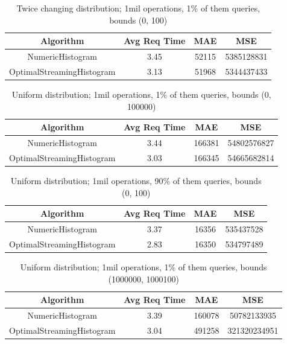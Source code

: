 \documentclass[12pt]{article}
\begin{document}
	\begin{table}[h!]
		\begin{center}
			\caption{Twice changing distribution; 1mil operations, 1\% of them queries, bounds (0, 100)}
			\label{tab:uniform}
			\begin{tabular}{c|c|c|c}
				\textbf{Algorithm} & \textbf{Avg Req Time} & \textbf{MAE} & \textbf{MSE}\\
				\hline
				NumericHistogram & 3.45 & 52115 & 5385128831 \\
				OptimalStreamingHistogram & 3.13 & 51968 & 5344437433 \\
		  \end{tabular}
		\end{center}
	\end{table}

	\begin{table}[h!]
		\begin{center}
			\caption{Uniform distribution; 1mil operations, 1\% of them queries, bounds (0, 100000)}
			\label{tab:uniform}
			\begin{tabular}{c|c|c|c}
				\textbf{Algorithm} & \textbf{Avg Req Time} & \textbf{MAE} & \textbf{MSE}\\
				\hline
				NumericHistogram & 3.44 & 166381 & 54802576827 \\
				OptimalStreamingHistogram & 3.03 & 166345 & 54665682814 \\
		  \end{tabular}
		\end{center}
	\end{table}

	\begin{table}[h!]
		\begin{center}
			\caption{Uniform distribution; 1mil operations, 90\% of them queries, bounds (0, 100)}
			\label{tab:uniform}
			\begin{tabular}{c|c|c|c}
				\textbf{Algorithm} & \textbf{Avg Req Time} & \textbf{MAE} & \textbf{MSE}\\
				\hline
				NumericHistogram & 3.37 & 16356 & 535437528 \\
				OptimalStreamingHistogram & 2.83 & 16350 & 534797489 \\
		  \end{tabular}
		\end{center}
	\end{table}

	\begin{table}[h!]
		\begin{center}
			\caption{Uniform distribution; 1mil operations, 1\% of them queries, bounds (1000000, 1000100)}
			\label{tab:uniform}
			\begin{tabular}{c|c|c|c}
				\textbf{Algorithm} & \textbf{Avg Req Time} & \textbf{MAE} & \textbf{MSE}\\
				\hline
				NumericHistogram & 3.39 & 160078 & 50782133935 \\
				OptimalStreamingHistogram & 3.04 & 491258 & 321320234951 \\
		  \end{tabular}
		\end{center}
	\end{table}
\end{document}
